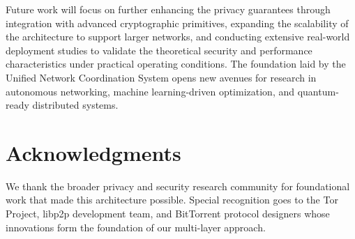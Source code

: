 \documentclass[11pt,a4paper]{article}
\theoremstyle{definition}
\theoremstyle{remark}
\begin{document}
Future work will focus on further enhancing the privacy guarantees through integration with advanced cryptographic primitives, expanding the scalability of the architecture to support larger networks, and conducting extensive real-world deployment studies to validate the theoretical security and performance characteristics under practical operating conditions. The foundation laid by the Unified Network Coordination System opens new avenues for research in autonomous networking, machine learning-driven optimization, and quantum-ready distributed systems.

\section*{Acknowledgments}

We thank the broader privacy and security research community for foundational work that made this architecture possible. Special recognition goes to the Tor Project, libp2p development team, and BitTorrent protocol designers whose innovations form the foundation of our multi-layer approach.
\end{document}
